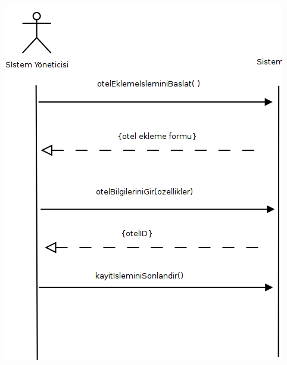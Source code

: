 \documentclass[12pt,a4paper]{report}
\begin{document}
\newpage

\begin{center}
\includegraphics{dia/ssd-usecase4.png}
\end{center}
\end{document}
